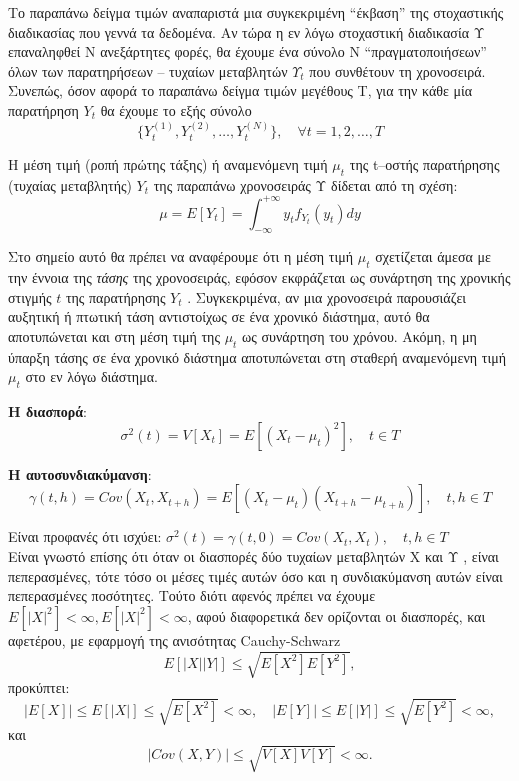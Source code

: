 Το παραπάνω δείγμα τιμών αναπαριστά μια συγκεκριμένη “έκβαση” της στοχαστικής
διαδικασίας που γεννά τα δεδομένα. Αν τώρα η εν λόγω στοχαστική διαδικασία Υ
επαναληφθεί Ν ανεξάρτητες φορές, θα έχουμε ένα σύνολο Ν “πραγματοποιήσεων” όλων
των παρατηρήσεων – τυχαίων μεταβλητών $Υ_t$ που συνθέτουν τη χρονοσειρά. Συνεπώς,
όσον αφορά το παραπάνω δείγμα τιμών μεγέθους Τ, για την κάθε μία παρατήρηση $Y_t$ θα
έχουμε το εξής σύνολο\\
$$ \{Y_t^{\left(1\right)},Y_t^{\left(2\right)},\ldots, Y_t^{\left(N\right)}\},\quad \forall t=1,2,\ldots,T$$


Η μέση τιμή (ροπή πρώτης τάξης) ή  αναμενόμενη τιμή $\mu_t$ της t–οστής παρατήρησης (τυχαίας μεταβλητής) $Y_t$
της παραπάνω χρονοσειράς Υ δίδεται από τη σχέση:\\
$$\mu = E \left[  Y_t \right]= \int_{-\infty }^{+\infty } y_tf_{Y_t}\left(y_t\right) dy   $$



Στο σημείο αυτό θα πρέπει να αναφέρουμε ότι η μέση τιμή $\mu_t$ σχετίζεται άμεσα
με την έννοια της \textit{τάσης} της χρονοσειράς, εφόσον εκφράζεται ως συνάρτηση της
χρονικής στιγμής $t$ της παρατήρησης $Y_t$ . Συγκεκριμένα, αν μια χρονοσειρά παρουσιάζει
αυξητική ή πτωτική τάση αντιστοίχως σε ένα χρονικό διάστημα, αυτό θα αποτυπώνεται
και στη μέση τιμή της $\mu_t$ ως συνάρτηση του χρόνου. Ακόμη, η μη ύπαρξη τάσης σε ένα
χρονικό διάστημα αποτυπώνεται στη σταθερή αναμενόμενη τιμή $\mu_t$ στο εν λόγω
διάστημα.

\textbf{Η διασπορά}:\\ $$\sigma^2\left( t \right) =V \left[X_t \right] = E\left[\left( X_t-\mu_t\right) ^2  \right], \quad t \in T    $$

 \textbf{Η αυτοσυνδιακύμανση}:\\
$$ \gamma\left(t,h \right) = Cov\left(X_t,X_{t+h} \right) =E\left[ \left(X_t-\mu_t \right)\left( X_{t+h}-\mu_{t+h}\right)  \right], \quad t,h \in T   $$ 

Είναι προφανές ότι ισχύει: 
$\sigma^2\left( t \right)=\gamma\left( t,0\right) =Cov\left(X_t,X_t \right),\quad t,h \in T   $ \\
Είναι γνωστό επίσης ότι όταν οι διασπορές δύο τυχαίων μεταβλητών Χ και Υ , είναι
πεπερασμένες, τότε τόσο οι μέσες τιμές αυτών όσο και η συνδιακύμανση αυτών
είναι πεπερασμένες ποσότητες. Τούτο διότι αφενός πρέπει να έχουμε\\
$E \left[ \vert X \vert ^2 \right]< ∞ , E \left[ \vert X \vert ^2 \right] < ∞ $, αφού διαφορετικά δεν ορίζονται οι διασπορές, και αφετέρου,
με εφαρμογή της ανισότητας Cauchy-Schwarz\\
$$E \left[\vert X \vert\vert Y \vert \right] \leq \sqrt{ E \left[ X^2 \right] E \left[ Y^2 \right]}, $$
προκύπτει:\\
$$\vert E \left[ X \right] \vert \leq E \left[\vert X \vert \right] \leq \sqrt{ E \left[ X^ 2 \right]} < ∞ , \quad \vert E \left[ Y \right] \vert \leq E \left[\vert Y \vert\right] \leq \sqrt{ E \left[ Y^ 2 \right]} < ∞  ,$$
και
$$ \vert Cov \left( X , Y \right) \vert \leq \sqrt{ V \left[ X \right] V \left[ Y \right]} < ∞ .$$


